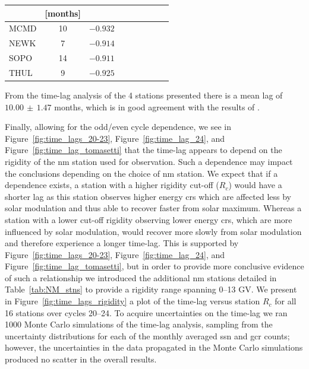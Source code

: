 {\begin{minipage}{0.42\textwidth}
\begin{tabular}{l c c c c c c c c}
			{} & {[months] } & {} \\ \hline	
			{ MCMD} & {10} & {$-0.932$} \\
			{ NEWK} & {7} & {$-0.914$} \\
			{ SOPO} & {14} & {$-0.911$} \\
			{ THUL} & {9} & {$-0.925$}  \\ \hline
		\end{tabular}
	\end{minipage}
	\hfill \break }
\medskip


From the time-lag analysis of the 4 stations presented there is a mean lag of $10.00 \, \pm \, 1.47$ months, which is in good agreement with the results of \cite{tomassetti_evidence_2017}.

Finally, allowing for the odd/even cycle dependence, we see in Figure~\ref{fig:time_lags_20-23}, Figure~\ref{fig:time_lag_24}, and Figure~\ref{fig:time_lag_tomasetti} that the time-lag appears to depend on the rigidity of the \gls{nm} station used for observation. Such a dependence may impact the conclusions depending on the choice of \gls{nm} station. We expect that if a dependence exists, a station with a higher rigidity cut-off ($R_c$) would have a shorter lag as this station observes higher energy \glspl{cr} which are affected less by solar modulation and thus able to recover faster from solar maximum. Whereas a station with a lower cut-off rigidity observing lower energy \glspl{cr}, which are more influenced by solar modulation, would recover more slowly from solar modulation and therefore experience a longer time-lag. This is supported by Figure~\ref{fig:time_lags_20-23}, Figure~\ref{fig:time_lag_24}, and Figure~\ref{fig:time_lag_tomasetti}, but in order to provide more conclusive evidence of such a relationship we introduced the additional \gls{nm} stations detailed in Table~\ref{tab:NM_stns} to provide a rigidity range spanning 0--13 GV. We present in Figure~\ref{fig:time_lags_rigidity} a plot of the time-lag versus station $R_c$ for all 16 stations over cycles 20--24. To acquire uncertainties on the time-lag we ran 1000 Monte Carlo simulations of the time-lag analysis, sampling from the uncertainty distributions for each of the monthly averaged \gls{ssn} and \gls{gcr} counts; however, the uncertainties in the data propagated in the Monte Carlo simulations produced no scatter in the overall results.

